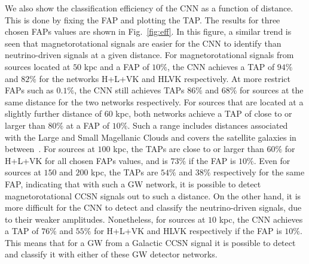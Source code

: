 \documentclass[aps,twocolumn,showpacs,groupedaddress, nofootinbib]{revtex4}  %
\begin{document}
%
%
We also show the classification efficiency of the \ac{CNN}  as a function of
distance.  This is done by fixing the \ac{FAP} and plotting the \ac{TAP}.  The
results for three chosen \acp{FAP} values are shown in Fig.~\ref{fig:eff}.  In
this figure, a similar trend is seen that magnetorotational signals are easier
for the \ac{CNN} to identify than neutrino-driven signals at a given distance.
For magnetorotational signals from sources located at $50$ kpc and a \ac{FAP}
of $10\%$, the \ac{CNN} achieves a \ac{TAP} of $94\%$ and $82\%$ for the
networks H+L+VK and HLVK respectively. At more restrict \acp{FAP} such as
$0.1\%$, the \ac{CNN} still achieves \acp{TAP} $86\%$ and $68\%$ for sources at
the same distance for the two networks respectively.  For sources that are
located at a slightly further distance of $60$ kpc, both networks achieve a
\ac{TAP} of close to or larger than $80\%$ at a \ac{FAP} of $10\%$. Such a range
includes distances associated with the Large and Small Magellanic Clouds and
covers the satellite galaxies in between~\cite{karachentsev2004catalog,
belokurov2007cats}.  For sources at $100$ kpc, the \acp{TAP} are close to or
larger than $60\%$ for H+L+VK for all chosen \acp{FAP} values, and is $73\%$ if
the \ac{FAP} is $10\%$. Even for sources at $150$ and $200$ kpc, the \acp{TAP}
are $54\%$ and $38\%$ respectively for the same \ac{FAP}, indicating that with
such a \ac{GW} network, it is possible to detect magnetorotational \ac{CCSN}
signals out to such a distance. On the other hand, it is more difficult for the
\ac{CNN} to detect and classify the neutrino-driven signals, due to their
weaker amplitudes. Nonetheless, for sources at $10$ kpc, the \ac{CNN} achieves
a \ac{TAP} of $76\%$ and $55\%$ for H+L+VK and HLVK respectively if the
\ac{FAP} is $10\%$.  This means that for a \ac{GW} from a Galactic \ac{CCSN}
signal it is possible to detect and classify it with either of these \ac{GW}
detector networks.
\end{document}
